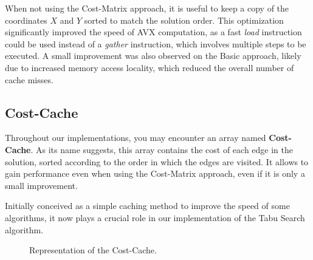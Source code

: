 When not using the Cost-Matrix approach, it is useful to keep a copy of the coordinates $X$ and $Y$ sorted to match the solution order.
This optimization significantly improved the speed of AVX computation, as a fast \textit{load} instruction could be used instead of a \textit{gather} instruction, which involves multiple steps to be executed.
A small improvement was also observed on the Basic approach, likely due to increased memory access locality, which reduced the overall number of cache misses.

\subsection{Cost-Cache}

Throughout our implementations, you may encounter an array named \textbf{Cost-Cache}.
As its name suggests, this array contains the cost of each edge in the solution, sorted according to the order in which the edges are visited.
It allows to gain performance even when using the Cost-Matrix approach, even if it is only a small improvement.

Initially conceived as a simple caching method to improve the speed of some algorithms, it now plays a crucial role in our implementation of the Tabu Search algorithm.

\begin{figure}[htbp]
    \centering
    \caption{Representation of the Cost-Cache.}
    \label{fig:solRepresentationExample}
\end{figure}

